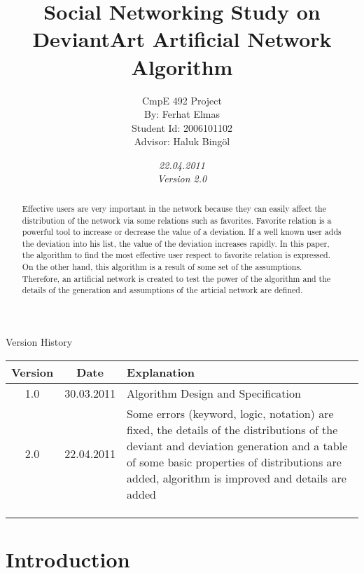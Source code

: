 \documentclass[12pt,a4paper]{report}
\title{Social Networking Study on DeviantArt Artificial Network Algorithm}
\date{\emph{22.04.2011} \\ \emph{Version 2.0} }
\author{CmpE 492 Project\\
	By: Ferhat Elmas \\
	Student Id: 2006101102\\
	Advisor: Haluk Bing\"{o}l
}
\begin{document}

\maketitle

\begin{table}[htdp]
\begin{center}
\textup{\Huge Version History}
\begin{tabular}{|c|c|p{10cm}|}
\hline
\textbf{Version} & \textbf{Date} & \textbf{Explanation} \\
\hline
1.0 & 30.03.2011 & Algorithm Design and Specification \\
\hline
2.0& 22.04.2011 & Some errors (keyword, logic, notation) are fixed, the details of the distributions of the deviant and deviation generation and a table of some basic properties of distributions are added, algorithm is improved and details are added\\
\hline
&&\\
\hline
&&\\
\hline
&&\\
\hline
\end{tabular}
\end{center}
\end{table}


\begin{abstract}
	
	Effective users are very important in the network because they can easily affect the distribution of the network via some relations such as favorites. Favorite relation is a powerful tool to increase or decrease the value of a deviation. If a well known user adds the deviation into his list, the value of the deviation increases rapidly. In this paper, the algorithm to find the most effective user respect to favorite relation is expressed. \\
	
	On the other hand, this algorithm is a result of some set of the assumptions. Therefore, an artificial network is created to test the power of the algorithm and the details of the generation and assumptions of the articial network are defined.
\end{abstract}

\tableofcontents

\chapter{Introduction}
	
\end{document}
